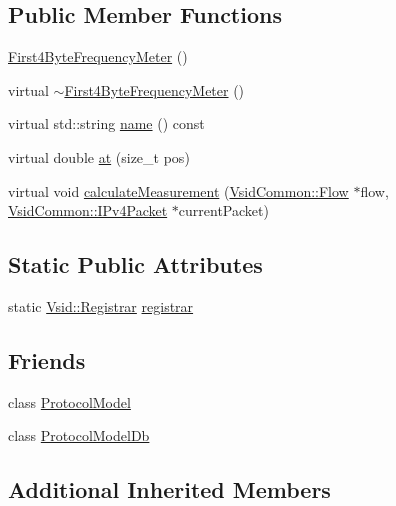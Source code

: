 \subsection*{Public Member Functions}
\begin{DoxyCompactItemize}
\item 
\hyperlink{class_vsid_1_1_first4_byte_frequency_meter_a109d17ab19e7836f135cc6bf09412dc2}{First4\-Byte\-Frequency\-Meter} ()
\item 
virtual \hyperlink{class_vsid_1_1_first4_byte_frequency_meter_afb2f30485b84588848ed1eb82b820a0e}{$\sim$\-First4\-Byte\-Frequency\-Meter} ()
\item 
virtual std\-::string \hyperlink{class_vsid_1_1_first4_byte_frequency_meter_a7e3eca220933b294beefa431801ffcc8}{name} () const 
\item 
virtual double \hyperlink{class_vsid_1_1_first4_byte_frequency_meter_a4ba5a1cd0fc2863a6aec337f980f9b78}{at} (size\-\_\-t pos)
\item 
virtual void \hyperlink{class_vsid_1_1_first4_byte_frequency_meter_a2137dd758531a111172c7a9952e18095}{calculate\-Measurement} (\hyperlink{class_vsid_common_1_1_flow}{Vsid\-Common\-::\-Flow} $\ast$flow, \hyperlink{class_vsid_common_1_1_i_pv4_packet}{Vsid\-Common\-::\-I\-Pv4\-Packet} $\ast$current\-Packet)
\end{DoxyCompactItemize}
\subsection*{Static Public Attributes}
\begin{DoxyCompactItemize}
\item 
static \hyperlink{class_vsid_1_1_registrar}{Vsid\-::\-Registrar} \hyperlink{class_vsid_1_1_first4_byte_frequency_meter_a7512bb139e9d0542d3c840a5c4f6052f}{registrar}
\end{DoxyCompactItemize}
\subsection*{Friends}
\begin{DoxyCompactItemize}
\item 
class \hyperlink{class_vsid_1_1_first4_byte_frequency_meter_a80219b863d4ff3456933d16bc5f73f45}{Protocol\-Model}
\item 
class \hyperlink{class_vsid_1_1_first4_byte_frequency_meter_a3c0d389e7a9476b06313d8fb9ca9fe68}{Protocol\-Model\-Db}
\end{DoxyCompactItemize}
\subsection*{Additional Inherited Members}


